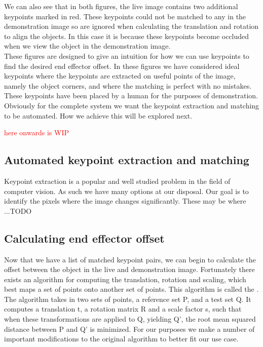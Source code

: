 We can also see that in both figures, the live image contains two additional keypoints marked in red. These keypoints could not be matched to any in the demonstration image so are ignored when calculating the translation and rotation to align the objects. In this case it is because these keypoints become occluded when we view the object in the demonstration image.\\

These figures are designed to give an intuition for how we can use keypoints to find the desired end effector offset. In these figures we have considered ideal keypoints where the keypoints are extracted on useful points of the image, namely the object corners, and where the matching is perfect with no mistakes. These keypoints have been placed by a human for the purposes of demonstration. Obviously for the complete system we want the keypoint extraction and matching to be automated. How we achieve this will be explored next.

\textcolor{red}{here onwards is WIP}

\subsection{Automated keypoint extraction and matching}
\label{subsec:keypoint-algos}
Keypoint extraction is a popular and well studied problem in the field of computer vision. As such we have many options at our disposal. Our goal is to identify the pixels where the image changes significantly. These may be where ...TODO

\subsection{Calculating end effector offset}
\label{subsec:kabsch}
Now that we have a list of matched keypoint pairs, we can begin to calculate the offset between the object in the live and demonstration image. Fortunately there exists an algorithm for computing the translation, rotation and scaling, which best maps a set of points onto another set of points. This algorithm is called the  \cite{kabsch}. The algorithm takes in two sets of points, a reference set P, and a test set Q. It computes a translation t, a rotation matrix R and a scale factor s, such that when these transformations are applied to Q, yielding Q', the root mean squared distance between P and Q' is minimized. For our purposes we make a number of important modifications to the original algorithm to better fit our use case.

